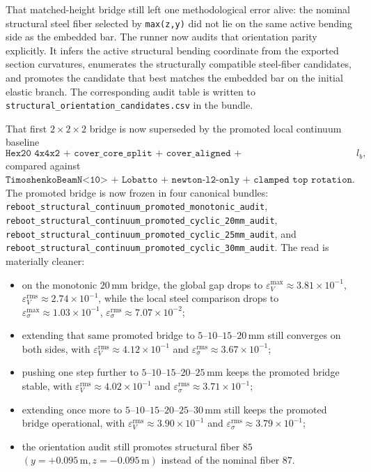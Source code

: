 That matched-height bridge still left one methodological error alive: the
nominal structural steel fiber selected by \texttt{max(z,y)} did not lie on
the same active bending side as the embedded bar. The runner now audits that
orientation parity explicitly. It infers the active structural bending
coordinate from the exported section curvatures, enumerates the structurally
compatible steel-fiber candidates, and promotes the candidate that best
matches the embedded bar on the initial elastic branch. The corresponding
audit table is written to
\texttt{structural\_orientation\_candidates.csv} in the bundle.

That first \(2\times2\times2\) bridge is now superseded by the promoted local
continuum baseline
\[
\texttt{Hex20 4x4x2 + cover\_core\_split + cover\_aligned + structural\_matched\_eight\_bar + production\_stabilized + fracture\_secant + fixed-end } l_b,
\]
compared against
\(\texttt{TimoshenkoBeamN<10> + Lobatto + newton-l2-only + clamped top rotation}\).
The promoted bridge is now frozen in four canonical bundles:
\texttt{reboot\_structural\_continuum\_promoted\_monotonic\_audit},
\texttt{reboot\_structural\_continuum\_promoted\_cyclic\_20mm\_audit},
\texttt{reboot\_structural\_continuum\_promoted\_cyclic\_25mm\_audit}, and
\texttt{reboot\_structural\_continuum\_promoted\_cyclic\_30mm\_audit}.  The
read is materially cleaner:
\begin{itemize}
  \item on the monotonic \(20\,\mathrm{mm}\) bridge, the global gap drops to
    \(\varepsilon_V^{\max} \approx 3.81\times10^{-1}\),
    \(\varepsilon_V^{\mathrm{rms}} \approx 2.74\times10^{-1}\), while the
    local steel comparison drops to
    \(\varepsilon_{\sigma}^{\max} \approx 1.03\times10^{-1}\),
    \(\varepsilon_{\sigma}^{\mathrm{rms}} \approx 7.07\times10^{-2}\);
  \item extending that same promoted bridge to
    \(5\)--\(10\)--\(15\)--\(20\,\mathrm{mm}\) still converges on both sides,
    with \(\varepsilon_V^{\mathrm{rms}} \approx 4.12\times10^{-1}\) and
    \(\varepsilon_{\sigma}^{\mathrm{rms}} \approx 3.67\times10^{-1}\);
  \item pushing one step further to
    \(5\)--\(10\)--\(15\)--\(20\)--\(25\,\mathrm{mm}\) keeps the promoted
    bridge stable, with \(\varepsilon_V^{\mathrm{rms}} \approx 4.02\times10^{-1}\)
    and \(\varepsilon_{\sigma}^{\mathrm{rms}} \approx 3.71\times10^{-1}\);
  \item extending once more to
    \(5\)--\(10\)--\(15\)--\(20\)--\(25\)--\(30\,\mathrm{mm}\) still keeps
    the promoted bridge operational, with
    \(\varepsilon_V^{\mathrm{rms}} \approx 3.90\times10^{-1}\) and
    \(\varepsilon_{\sigma}^{\mathrm{rms}} \approx 3.79\times10^{-1}\);
  \item the orientation audit still promotes structural fiber \(85\)
    \((y=+0.095\,\mathrm{m}, z=-0.095\,\mathrm{m})\) instead of the nominal
    fiber \(87\).
\end{itemize}

